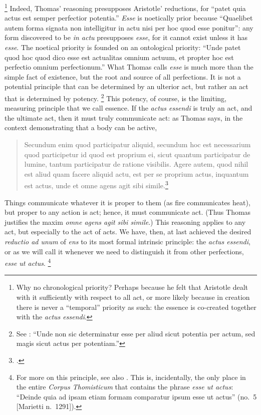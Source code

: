 %
\footnote{Why no chronological priority? Perhaps because he felt that Aristotle dealt with it sufficiently with respect to all act, or more likely because in creation there is never a ``temporal'' priority as such: the essence is co-created together with the \emph{actus essendi}.}
%
Indeed, Thomas' reasoning presupposes Aristotle' reductions, for ``patet quia actus est semper perfectior potentia.'' \emph{Esse} is noetically prior because ``Quaelibet autem forma signata non intelligitur in actu nisi per hoc quod esse ponitur'': any form discovered to be \emph{in actu} presupposes \emph{esse}, for it cannot exist unless it has \emph{esse}. The noetical priority is founded on an ontological priority: ``Unde patet quod hoc quod dico esse est actualitas omnium actuum, et propter hoc est perfectio omnium perfectionum.'' What Thomas calls \emph{esse} is much more than the simple fact of existence, but the root and source of all perfections. It is not a potential principle that can be determined by an ulterior act, but rather an act that is determined by potency.%
%
\footnote{See \cite[q.~7, a.~2 ad~9]{st:depotentia}: ``Unde non sic determinatur esse per aliud sicut potentia per actum, sed magis sicut actus per potentiam.''} This potency, of course, is the limiting, measuring principle that we call essence. If the \emph{actus essendi} is truly an act, and the ultimate act, then it must truly communicate act: as Thomas says, in the context demonstrating that a body can be active,
%
\begin{quotation}
Secundum enim quod participatur aliquid, secundum hoc est necessarium quod participetur id quod est proprium ei, sicut quantum participatur de lumine, tantum participatur de ratione visibilis. Agere autem, quod nihil est aliud quam facere aliquid actu, est per se proprium actus, inquantum est actus, unde et omne agens agit sibi simile.\footcite[I, q.~115, a.~1, co.]{st:summa}
\end{quotation}
%
Things communicate whatever it is proper to them (as fire communicates heat), but proper to any action is act; hence, it must communicate act. (Thus Thomas justifies the maxim \emph{omne agens agit sibi simile}.) This reasoning applies to any act, but especially to the act of acts. We have, then, at last achieved the desired \emph{reductio ad unum} of \emph{ens} to its most formal intrinsic principle: the \emph{actus essendi}, or as we will call it whenever we need to distinguish it from other perfections, \emph{esse ut actus}.%
%
\footnote{For more on this principle, see also \cite[II, cap.~54]{st:contragent}. This is, incidentally, the only place in the entire \emph{Corpus Thomisticum} that contains the phrase \emph{esse ut actus}: ``Deinde quia ad ipsam etiam formam comparatur ipsum esse ut actus'' (no.~5 [Marietti n.~1291]).}
%

